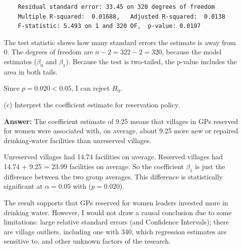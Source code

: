 \documentclass[12pt,letterpaper]{article}
\begin{document}
\begin{enumerate}
\begin{verbatim}
	Residual standard error: 33.45 on 320 degrees of freedom
	Multiple R-squared:  0.01688,	Adjusted R-squared:  0.0138 
	F-statistic: 5.493 on 1 and 320 DF,  p-value: 0.0197
\end{verbatim}
	\noindent The test statistic shows how many standard errors the estimate is away from 0. The degrees of freedom are $n - 2 = 322 - 2 = 320$, because the model estimates ($\beta_0$ and $\beta_1$). Because the test is two-tailed, the p-value includes the area in both tails.
	
	\noindent Since $p = 0.020 < 0.05$, I can reject $H_0$. 
	
	\item [(c)] Interpret the coefficient estimate for reservation policy. 
	
	\noindent \textbf{Answer:} The coefficient estimate of 9.25 means that villages in GPs reserved for women were associated with, on average, about 9.25 more new or repaired drinking-water facilities than unreserved villages. 
	
	\noindent Unreserved villages had 14.74 facilities on average. Reserved villages had 14.74 + 9.25 = 23.99 facilities on average. So the coefficient $\beta_1$ is just the difference between the two group averages. This difference is statistically significant at $\alpha = 0.05$ with ($p = 0.020$). 
	
	\noindent The result supports that GPs reserved for women leaders invested more in drinking water. However, I would not draw a causal conclusion due to some limitations: large relative standard errors (and Confidence Intervals); there are village outliers, including one with 340, which regression estimates are sensitive to, and other unknown factors of the research.

\end{enumerate}


\end{document}
